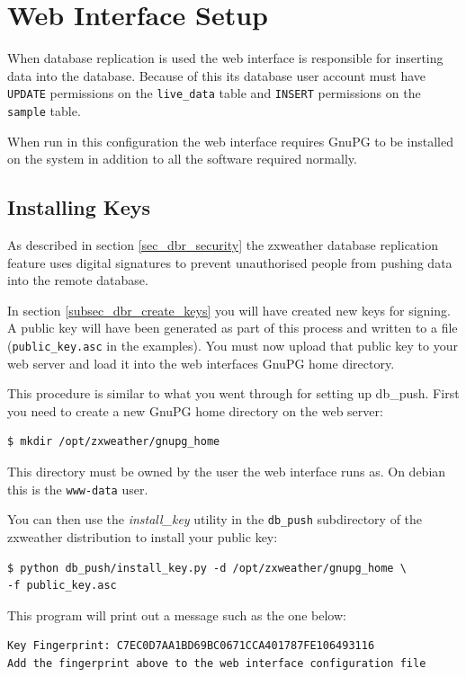 \documentclass[a4paper,10pt,draft]{book}
\begin{document}
\section{Web Interface Setup}

When database replication is used the web interface is responsible for inserting data into the database. Because of this its database user account must have \verb|UPDATE| permissions on the \verb|live_data| table and \verb|INSERT| permissions on the \verb|sample| table.

When run in this configuration the web interface requires GnuPG to be installed on the system in addition to all the software required normally.

\subsection{Installing Keys}
\label{sec_dbr_installing_keys}
As described in section \ref{sec_dbr_security} the zxweather database replication feature uses digital signatures to prevent unauthorised people from pushing data into the remote database.

In section \ref{subsec_dbr_create_keys} you will have created new keys for signing. A public key will have been generated as part of this process and written to a file (\verb|public_key.asc| in the examples). You must now upload that public key to your web server and load it into the web interfaces GnuPG home directory.

This procedure is similar to what you went through for setting up db\_push. First you need to create a new GnuPG home directory on the web server:
\begin{verbatim}
$ mkdir /opt/zxweather/gnupg_home
\end{verbatim}

This directory must be owned by the user the web interface runs as. On debian this is the \verb|www-data| user.

You can then use the \emph{install\_key} utility in the \verb|db_push| subdirectory of the zxweather distribution to install your public key:

\begin{verbatim}
$ python db_push/install_key.py -d /opt/zxweather/gnupg_home \
-f public_key.asc
\end{verbatim}

This program will print out a message such as the one below:
\begin{verbatim}
Key Fingerprint: C7EC0D7AA1BD69BC0671CCA401787FE106493116
Add the fingerprint above to the web interface configuration file
\end{verbatim}
\end{document}
